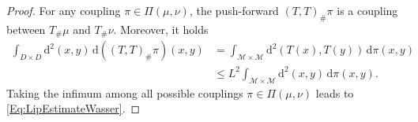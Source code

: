\documentclass[10pt,a4paper]{amsart}
\newcommand{\dd}{\mathrm{d}}
\begin{document}
\begin{proof}
For any coupling $\pi \in \Pi(\mu, \nu)$, the push-forward $(T,T)_\# \pi$ is a coupling between $T_\# \mu$ and $T_\# \nu$. Moreover, it holds
\[
\begin{split}
\int_{D\times D} \dd^2(x,y) \,\dd ((T,T)_\#\pi)(x,y) & = \int_{\mathcal{M}\times\mathcal{M}} \dd^2(T(x),T(y))\, \dd \pi(x,y)\\
&\le L^2 \int_{\mathcal{M}\times\mathcal{M}} \dd^2(x,y) \, \dd \pi(x,y).
\end{split}
\]
Taking the infimum among all possible couplings $\pi \in \Pi(\mu,\nu)$ leads to \eqref{Eq:LipEstimateWasser}.
\end{proof}
\end{document}
